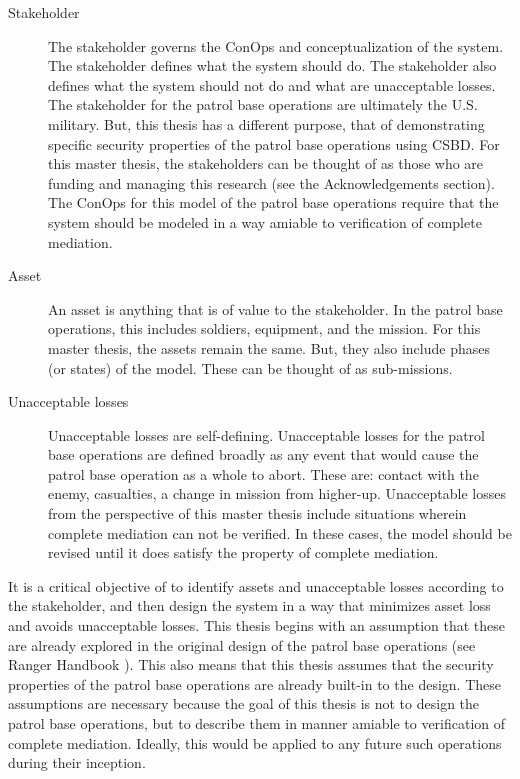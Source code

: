 \documentclass[../../main/main.tex]{subfiles}
\begin{document}
\begin{description}
\item[ Stakeholder]  The stakeholder governs the ConOps and conceptualization of the system.  The stakeholder defines what the system should do.  The stakeholder also defines what the system should not do and what are unacceptable losses.  The stakeholder for the patrol base operations are ultimately the U.S. military.  But, this thesis has a different purpose, that of demonstrating specific security properties of the patrol base operations using CSBD.  For this master thesis, the stakeholders can be thought of as those who are funding and managing this research (see the Acknowledgements section).  The ConOps for this model of the patrol base operations require that the system should be modeled in a way amiable to verification of complete mediation.


\item[Asset] An asset is anything that is of value to the stakeholder.   In the patrol base operations, this includes soldiers, equipment, and the mission.  For this master thesis, the assets remain the same.  But, they also include phases (or states) of the model.  These can be thought of as sub-missions.

\item[Unacceptable losses] Unacceptable losses are self-defining.  Unacceptable losses for the patrol base operations are defined broadly as any event that would cause the patrol base operation as a whole to abort.  These are: contact with the enemy, casualties, a change in mission from higher-up.  Unacceptable losses from the perspective of this master thesis include situations wherein complete mediation can not be verified.  In these cases, the model should be revised until it does satisfy the property of complete mediation.
\end{description}

It is a critical objective of  to identify assets and unacceptable losses according to the stakeholder, and then design the system in a way that minimizes asset loss and avoids unacceptable losses.  This thesis begins with an assumption that these are already explored in the original design of the patrol base operations (see Ranger Handbook \cite{rangermanual}).  This also means that this thesis assumes that the security properties of the patrol base operations are already built-in to the design.  These assumptions are necessary because the goal of this thesis is not to design the patrol base operations, but to describe them in manner amiable to verification of complete mediation.  Ideally, this would be applied to any future such operations during their inception.  
\end{document}
